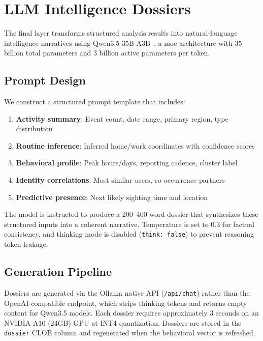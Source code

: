 \documentclass[11pt,a4paper]{article}
\begin{document}
\section{LLM Intelligence Dossiers}
\label{sec:dossiers}

The final layer transforms structured analysis results into natural-language intelligence narratives using Qwen3.5-35B-A3B~\cite{qwen2024qwen25}, a \gls{moe} architecture with 35 billion total parameters and 3 billion active parameters per token.

\subsection{Prompt Design}

We construct a structured prompt template that includes:

\begin{enumerate}
    \item \textbf{Activity summary}: Event count, date range, primary region, type distribution
    \item \textbf{Routine inference}: Inferred home/work coordinates with confidence scores
    \item \textbf{Behavioral profile}: Peak hours/days, reporting cadence, cluster label
    \item \textbf{Identity correlations}: Most similar users, co-occurrence partners
    \item \textbf{Predictive presence}: Next likely sighting time and location
\end{enumerate}

The model is instructed to produce a 200--400 word dossier that synthesizes these structured inputs into a coherent narrative. Temperature is set to 0.3 for factual consistency, and thinking mode is disabled (\texttt{think: false}) to prevent reasoning token leakage.

\subsection{Generation Pipeline}

Dossiers are generated via the Ollama native API (\texttt{/api/chat}) rather than the OpenAI-compatible endpoint, which strips thinking tokens and returns empty content for Qwen3.5 models. Each dossier requires approximately 3 seconds on an NVIDIA A10 (24GB) GPU at INT4 quantization. Dossiers are stored in the \texttt{dossier} CLOB column and regenerated when the behavioral vector is refreshed.
\end{document}
